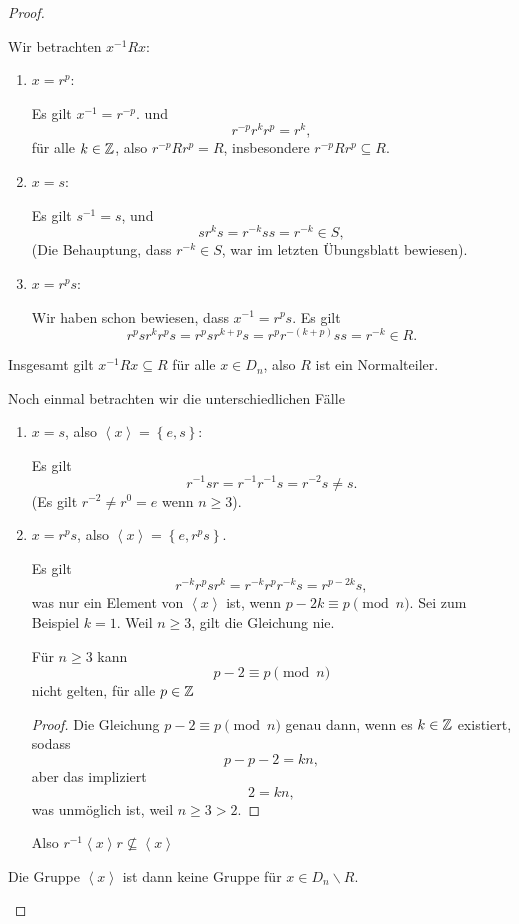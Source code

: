 \begin{proof}
	\begin{parts}
	\item Wir betrachten $x^{-1}Rx$:
		\begin{enumerate}[label=(\roman*)]
			\item $x=r^p$:

				Es gilt $x^{-1}=r^{-p}$. und
				\[
					r^{-p}r^kr^p=r^k
				,\]
				f\"{u}r alle $k\in \mathbb{Z}$, also $r^{-p}Rr^p=R$, insbesondere $r^{-p}Rr^p\subseteq R$.
			\item $x=s$:

				Es gilt $s^{-1}=s$, und
				\[
					s r^k s= r^{-k} ss=r^{-k}\in S
				,\]
				(Die Behauptung, dass $r^{-k}\in S$, war im letzten Übungsblatt bewiesen).

			\item $x=r^ps$:

				Wir haben schon bewiesen, dass  $x^{-1}=r^ps$. Es gilt
				 \[
					 r^p s r^k r^p s=r^p s r^{k+p}s = r^p r^{-(k+p)}s s=r^{-k}\in R
				.\]
		\end{enumerate}
		Insgesamt gilt $x^{-1}Rx\subseteq R$ f\"{u}r alle $x\in D_n$, also $R$ ist ein Normalteiler.
	\item Noch einmal betrachten wir die unterschiedlichen Fälle
		\begin{enumerate}[label=(\roman*)]
			\item $x=s$, also $\left<x \right> = \left\{ e,s \right\} $:

				Es gilt
				\[
					r^{-1}s r=r^{-1}r^{-1}s=r^{-2}s\neq s
				.\] 
				(Es gilt $r^{-2}\neq r^0=e$ wenn $n\ge 3$).
			\item $x=r^ps$, also $\left<x \right> = \left\{ e, r^p s \right\} $.

				Es gilt
				\[
					r^{-k}r^p s r^k=r^{-k}r^pr^{-k}s=r^{p-2k}s
				,\] 
				was nur ein Element von $\left<x \right>$ ist, wenn $p-2k\equiv p\pmod{n}$. Sei zum Beispiel $k=1$. Weil $n\ge 3$, gilt die Gleichung nie.
				\begin{tcolorbox}
					\begin{Lemma}
						F\"{u}r $n\ge 3$ kann
						\[
							p-2\equiv p\pmod{n}
						\]
						nicht gelten, f\"{u}r alle $p\in \mathbb{Z}$
					\end{Lemma}
					\begin{proof}
						Die Gleichung $p-2\equiv p\pmod{n}$ genau dann, wenn es $k\in \mathbb{Z}$ existiert, sodass
						\[
						p-p-2=kn
						,\]
						aber das impliziert
\[
2=kn
,\] 
was unmöglich ist, weil $n\ge 3 > 2$.
					\end{proof}
				\end{tcolorbox}
				Also $r^{-1}\left<x \right>r\not\subseteq \left<x \right>$
		\end{enumerate}
		Die Gruppe $\left<x \right>$ ist dann keine Gruppe f\"{u}r $x\in D_n\backslash R$.\qedhere
	\end{parts}
\end{proof}

